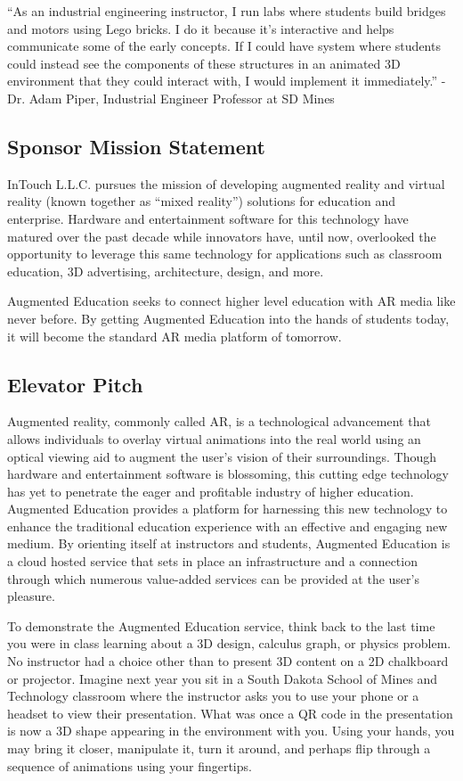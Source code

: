 “As an industrial engineering instructor, I run labs where students build bridges and motors using Lego bricks. I do it because it's interactive and helps communicate some of the early concepts. If I could  have system where students could instead see the components of these structures in an animated 3D environment that they could interact with, I would implement it immediately.” - Dr. Adam Piper, Industrial Engineer Professor at SD Mines



\subsection{Sponsor Mission Statement}
InTouch L.L.C. pursues the mission of developing augmented reality and virtual reality (known together as “mixed reality”) solutions for education and enterprise. Hardware and entertainment software for this technology have matured over the past decade while innovators have, until now, overlooked the opportunity to leverage this same technology for applications such as classroom education, 3D advertising, architecture, design, and more.  

Augmented Education seeks to connect higher level education with AR media like never before. By getting Augmented Education into the hands of students today, it will become the standard AR media platform of tomorrow. 

\subsection{Elevator Pitch}
Augmented reality, commonly called AR, is a technological advancement that allows individuals to overlay virtual animations into the real world using an optical viewing aid to augment the user’s vision of their surroundings. Though hardware and entertainment software is blossoming, this cutting edge technology has yet to penetrate the eager and profitable industry of higher education. Augmented Education provides a platform for harnessing this new technology to enhance the traditional education experience with an effective and engaging new medium. By orienting itself at instructors and students, Augmented Education is a cloud hosted service that sets in place an infrastructure and a connection through which numerous value-added services can be provided at the user’s pleasure.

To demonstrate the Augmented Education service, think back to the last time you were in class learning about a 3D design, calculus graph, or physics problem. No instructor had a choice other than to present 3D content on a 2D chalkboard or projector. Imagine next year you sit in  a South Dakota School of Mines and Technology classroom where the instructor asks you to use your phone or a headset to view their presentation. What was once a QR code in the presentation is now a 3D shape appearing in the environment with you. Using your hands, you may bring it closer, manipulate it, turn it around, and perhaps flip through a sequence of animations using your fingertips.

